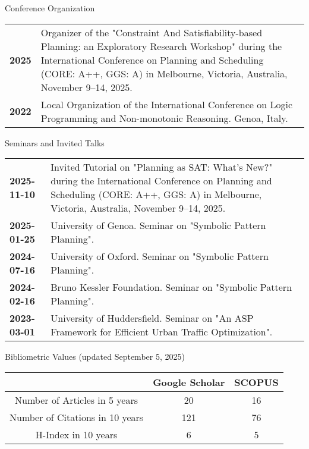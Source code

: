 \documentclass{resume} %
\begin{document}
   \begin{rSection}{Conference Organization}
	\begin{tabularx}{0.95\textwidth} {lp{14cm}}
 \textbf{2025} & Organizer of the "Constraint And Satisfiability-based Planning: an Exploratory Research Workshop" during the International Conference on Planning and Scheduling (CORE: A++, GGS: A) in Melbourne, Victoria, Australia, November 9–14, 2025. \\
  \textbf{2022} & Local Organization of the International Conference on Logic Programming and Non-monotonic Reasoning. Genoa, Italy.
  \end{tabularx}
 \end{rSection}


 \begin{rSection}{Seminars and Invited Talks}
 	\begin{tabularx}{0.95\textwidth} {lp{14cm}}
 \textbf{2025-11-10} & Invited Tutorial on "Planning as SAT: What's New?" during the International Conference on Planning and Scheduling (CORE: A++, GGS: A) in Melbourne, Victoria, Australia, November 9–14, 2025.\\
  \textbf{2025-01-25} & University of Genoa. Seminar on "Symbolic Pattern Planning".\\
 \textbf{2024-07-16} & University of Oxford. Seminar on "Symbolic Pattern Planning".\\
 \textbf{2024-02-16} & Bruno Kessler Foundation. Seminar on "Symbolic Pattern Planning".\\
 \textbf{2023-03-01} & University of Huddersfield. Seminar on "An ASP Framework for Efficient Urban Traffic Optimization".\\
 \end{tabularx}

\end{rSection}

\break
\begin{rSection}{Bibliometric Values \tiny{(updated September 5, 2025)}}
\begin{center}
	
\begin{tabular}{ccc}

 & Google Scholar & SCOPUS \\ \hline
\multicolumn{1}{c}{Number of Articles in 5 years} & 20 & 16 \\ \hline
\multicolumn{1}{c}{Number of Citations in 10 years} & 121 & 76 \\ \hline
\multicolumn{1}{c}{H-Index in 10 years} & 6 & 5 \\ 
\end{tabular}%
\end{center}
\end{rSection}
\end{document}
